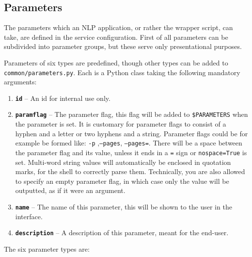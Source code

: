 \documentclass[a4paper,12pt]{report}
\begin{document}
\subsection{Parameters}
\label{sec:parameters}

The parameters which an NLP application, or rather the wrapper script, can take, are defined in the service configuration. First of all parameters can be subdivided into parameter groups, but these serve only presentational purposes. 

Parameters of six types are predefined, though other types can be added to \texttt{common/parameters.py}. Each is a Python class taking the following mandatory arguments:

\begin{enumerate}
\item \textbf{\texttt{id}} -- An id for internal use only.
\item \textbf{\texttt{paramflag}} -- The parameter flag, this flag will be added to \texttt{\$PARAMETERS} when the parameter is set. It is customary for parameter flags to consist of a hyphen and a letter or two hyphens and a string. Parameter flags could be for example be formed like: \texttt{-p} ,\texttt{--pages}, \texttt{--pages=}. There will be a space between the parameter flag and its value, unless it ends in a \texttt{=} sign or \texttt{nospace=True} is set. Multi-word string values will automatically be enclosed in quotation marks, for the shell to correctly parse them. Technically, you are also allowed to specify an empty parameter flag, in which case only the value will be outputted, as if it were an argument.
\item \textbf{\texttt{name}} -- The name of this parameter, this will be shown to the user in the interface.
\item \textbf{\texttt{description}} -- A description of this parameter, meant for the end-user.
\end{enumerate}


The six parameter types are:
\end{document}
